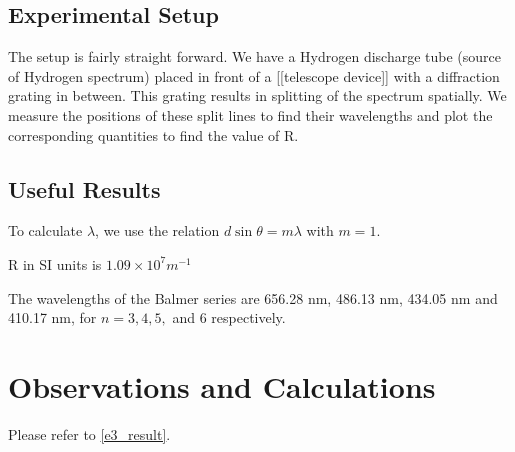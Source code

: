 	\subsection{Experimental Setup}	
		The setup is fairly straight forward. We have a Hydrogen discharge tube (source of Hydrogen spectrum) placed in front of a [[telescope device]] with a diffraction grating in between. This grating results in splitting of the spectrum spatially. We measure the positions of these split lines to find their wavelengths and plot the corresponding quantities to find the value of R.
	\subsection{Useful Results}
		To calculate $\lambda$, we use the relation $d \sin \theta = m \lambda$ with $m = 1$.
		\par
		R in SI units is $1.09 \times 10^7 m^{-1}$
		\par
		The wavelengths of the Balmer series are 656.28 nm, 486.13 nm, 434.05 nm and 410.17 nm, for $n = 3, 4, 5,$ and $6$ respectively.
\section{Observations and Calculations}
	Please refer to \autoref{e3_result}.


